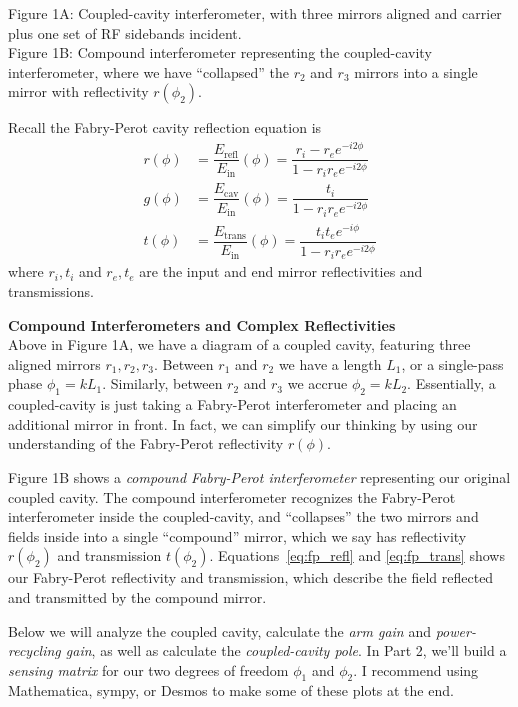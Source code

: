 \documentclass[11pt]{article}
\begin{document}
\noindent Figure 1A: Coupled-cavity interferometer, with three mirrors aligned and carrier plus one set of RF sidebands incident.\\
\noindent Figure 1B: Compound interferometer representing the coupled-cavity interferometer, where we have ``collapsed'' the $r_2$ and $r_3$ mirrors into a single mirror with reflectivity $r(\phi_2)$.

Recall the Fabry-Perot cavity reflection equation is 
\begin{align}
\label{eq:fp_refl}
r(\phi) &= \dfrac{E_\mathrm{refl}}{E_\mathrm{in}}(\phi) = \dfrac{r_i - r_e e^{-i 2 \phi}}{1 - r_i r_e e^{-i 2 \phi}}\\
\label{eq:fp_cav}
g(\phi) &= \dfrac{E_\mathrm{cav}}{E_\mathrm{in}}(\phi) = \dfrac{t_i}{1 - r_i r_e e^{-i 2 \phi}}\\
\label{eq:fp_trans}
t(\phi) &= \dfrac{E_\mathrm{trans}}{E_\mathrm{in}}(\phi) = \dfrac{t_i t_e e^{-i \phi}}{1 - r_i r_e e^{-i 2 \phi}}
\end{align} 
where $r_i, t_i$ and $r_e,t_e$ are the input and end mirror reflectivities and transmissions.

\newpage 
\noindent
\textbf{Compound Interferometers and Complex Reflectivities}\\

Above in Figure 1A, we have a diagram of a coupled cavity, featuring three aligned mirrors $r_1, r_2, r_3$.
Between $r_1$ and $r_2$ we have a length $L_1$, or a single-pass phase $\phi_1 = k L_1$.
Similarly, between $r_2$ and $r_3$ we accrue $\phi_2 = k L_2$.
Essentially, a coupled-cavity is just taking a Fabry-Perot interferometer and placing an additional mirror in front.  
In fact, we can simplify our thinking by using our understanding of the Fabry-Perot reflectivity $r(\phi)$.

Figure 1B shows a \textit{compound Fabry-Perot interferometer} representing our original coupled cavity.
The compound interferometer recognizes the Fabry-Perot interferometer inside the coupled-cavity, and ``collapses'' the two mirrors and fields inside into a single ``compound'' mirror, which we say has reflectivity $r(\phi_2)$ and transmission $t(\phi_2)$.
Equations~\ref{eq:fp_refl} and \ref{eq:fp_trans} shows our Fabry-Perot reflectivity and transmission, which describe the field reflected and transmitted by the compound mirror.


Below we will analyze the coupled cavity, 
calculate the \textit{arm gain} and \textit{power-recycling gain}, 
as well as calculate the \textit{coupled-cavity pole}.
In Part 2, we'll build a \textit{sensing matrix} for our two degrees of freedom $\phi_1$ and $\phi_2$.
I recommend using Mathematica, sympy, or Desmos to make some of these plots at the end.
\end{document}
